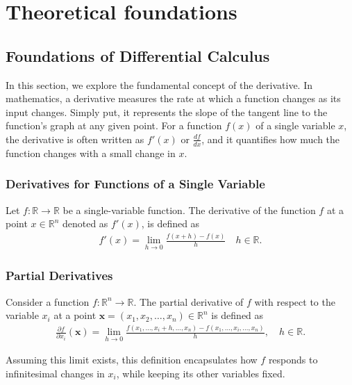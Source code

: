 \chapter{Theoretical foundations}\label{ch:introduction}

\section{Foundations of Differential Calculus}
\label{sec:foundationcalc}


In this section, we explore the fundamental concept of the derivative.
In mathematics, a derivative measures the rate at which a function changes as its input changes. 
Simply put, it represents the slope of the tangent line to the function's graph at any given point. 
For a function $f(x) $ of a single variable $ x $, the derivative is often written as $ f'(x)$  or $\frac{df}{dx} $,
and it quantifies how much the function changes with a small change in $ x $.

\subsection{Derivatives for Functions of a Single Variable}
\label{sec:derivative}

Let $ f: \mathbb{R} \to \mathbb{R} $ be a single-variable function. The derivative of the function $ f $ at a point $x \in \mathbb{R}^n $ denoted as $ f'(x) $, is defined as
\begin{align}
    f'(x) = \lim_{h \to 0} \frac{f(x + h) - f(x)}{h} \quad h \in \mathbb{R}.
\end{align}
\subsection{Partial Derivatives}
\label{sec:partial_derivative}


Consider a function $ f: \mathbb{R}^n \to \mathbb{R} $.
The partial derivative of $f$ with respect to the variable $ x_i $ at a point $ \mathbf{x} = (x_1, x_2, \ldots, x_n) \in \mathbb{R}^n $ is defined as
\begin{align}
 \frac{\partial f}{\partial x_i}(\mathbf{x}) = \lim_{h \to 0} \frac{f(x_1, \ldots, x_i+h, \ldots, x_n) - f(x_1, \ldots, x_i, \ldots, x_n)}{h}, \quad h \in \mathbb{R}.
\end{align}

Assuming this limit exists, this definition encapsulates how $f$ responds to infinitesimal changes in $x_i$, while keeping its other variables fixed.

